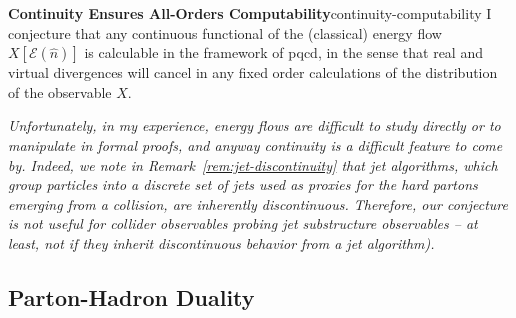 \vspace{-10pt}
\begin{adjustwidth}{20pt}{20pt}
    \begin{conjecture}{{\bf Continuity Ensures All-Orders Computability}}{continuity-computability}
        {\rm
            I conjecture that any continuous functional of the (classical) energy flow \(X[\mathcal{E}(\hat{n})]\) is calculable in the framework of \gls{pqcd}, in the sense that real and virtual divergences will cancel in any fixed order calculations of the distribution of the observable \(X\).
        }
    \end{conjecture}
\textit{
    Unfortunately, in my experience, energy flows are difficult to study directly or to manipulate in formal proofs, and anyway continuity is a difficult feature to come by.
    Indeed, we note in Remark~\ref{rem:jet-discontinuity} that jet algorithms, which group particles into a discrete set of jets used as proxies for the hard partons emerging from a collision, are inherently discontinuous.
    Therefore, our conjecture is not useful for collider observables probing jet substructure observables -- at least, not if they inherit discontinuous behavior from a jet algorithm).
}
\end{adjustwidth}




\subsection{Parton-Hadron Duality}
\label{sec:phd}

